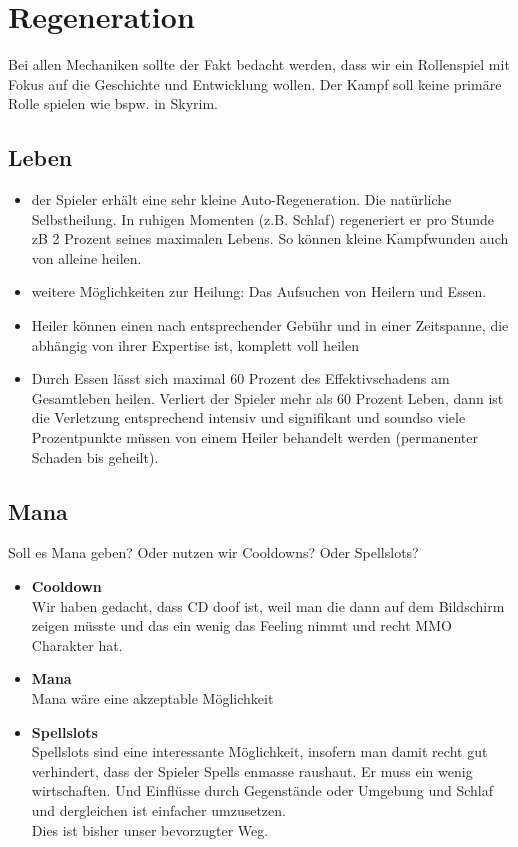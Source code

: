 \chapter{Regeneration}
Bei allen Mechaniken sollte der Fakt bedacht werden, dass wir ein Rollenspiel mit Fokus auf die Geschichte und Entwicklung wollen. Der Kampf soll keine primäre Rolle spielen wie bspw. in Skyrim.

\section{Leben}
\begin{itemize}
	\item der Spieler erhält eine sehr kleine Auto-Regeneration. Die natürliche Selbstheilung. In ruhigen Momenten (z.B. Schlaf) regeneriert er pro Stunde zB 2 Prozent seines maximalen Lebens. So können kleine Kampfwunden auch von alleine heilen.
	\item weitere Möglichkeiten zur Heilung: Das Aufsuchen von Heilern und Essen.
	\item Heiler können einen nach entsprechender Gebühr und in einer Zeitspanne, die abhängig von ihrer Expertise ist, komplett voll heilen
	\item Durch Essen lässt sich maximal 60 Prozent des Effektivschadens am Gesamtleben heilen. Verliert der Spieler mehr als 60 Prozent Leben, dann ist die Verletzung entsprechend intensiv und signifikant und soundso viele Prozentpunkte müssen von einem Heiler behandelt werden (permanenter Schaden bis geheilt).
\end{itemize}

\section{Mana}
Soll es Mana geben? Oder nutzen wir Cooldowns? Oder Spellslots?\\
\begin{itemize}
	\item \textbf{Cooldown}\\
	Wir haben gedacht, dass CD doof ist, weil man die dann auf dem Bildschirm zeigen müsste und das ein wenig das Feeling nimmt und recht MMO Charakter hat.
	\item \textbf{Mana}\\
	Mana wäre eine akzeptable Möglichkeit
	\item \textbf{Spellslots}\\
	Spellslots sind eine interessante Möglichkeit, insofern man damit recht gut verhindert, dass der Spieler Spells enmasse raushaut. Er muss ein wenig wirtschaften. Und Einflüsse durch Gegenstände oder Umgebung und Schlaf und dergleichen ist einfacher umzusetzen.\\
	Dies ist bisher unser bevorzugter Weg.
\end{itemize}



